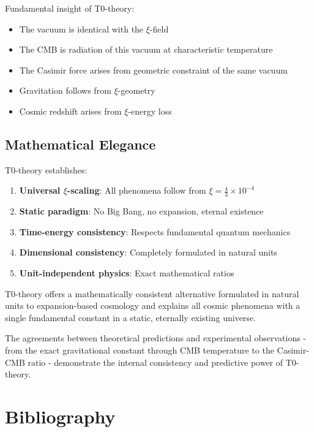 \documentclass[12pt,a4paper]{article}
\begin{document}
	\begin{important}
		Fundamental insight of T0-theory:
		\begin{itemize}
			\item The vacuum is identical with the $\xi$-field
			\item The CMB is radiation of this vacuum at characteristic temperature
			\item The Casimir force arises from geometric constraint of the same vacuum
			\item Gravitation follows from $\xi$-geometry
			\item Cosmic redshift arises from $\xi$-energy loss
		\end{itemize}
	\end{important}
	
	\subsection{Mathematical Elegance}
	
	T0-theory establishes:
	\begin{enumerate}
		\item \textbf{Universal $\xi$-scaling}: All phenomena follow from $\xi = \frac{4}{3} \times 10^{-4}$
		\item \textbf{Static paradigm}: No Big Bang, no expansion, eternal existence
		\item \textbf{Time-energy consistency}: Respects fundamental quantum mechanics
		\item \textbf{Dimensional consistency}: Completely formulated in natural units
		\item \textbf{Unit-independent physics}: Exact mathematical ratios
	\end{enumerate}
	
	\begin{revolutionary}
		T0-theory offers a mathematically consistent alternative formulated in natural units to expansion-based cosmology and explains all cosmic phenomena with a single fundamental constant in a static, eternally existing universe.
	\end{revolutionary}
	
	The agreements between theoretical predictions and experimental observations - from the exact gravitational constant through CMB temperature to the Casimir-CMB ratio - demonstrate the internal consistency and predictive power of T0-theory.
	
	\section{Bibliography}
	
\end{document}
